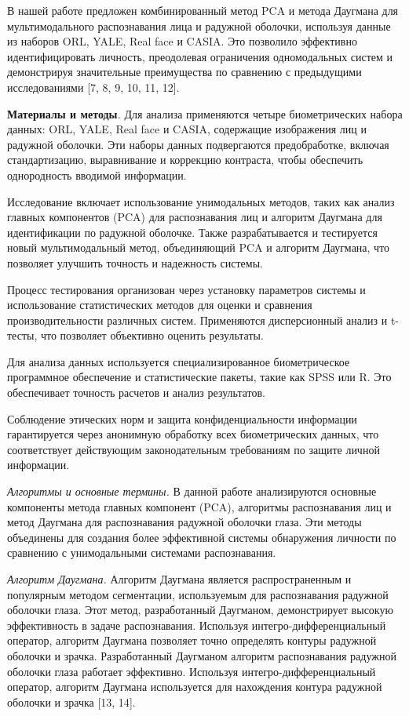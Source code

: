 \begin{multicols}{2}
В нашей работе предложен комбинированный метод PCA и метода Даугмана для
мультимодального распознавания лица и радужной оболочки, используя
данные из наборов ORL, YALE, Real face и CASIA. Это позволило эффективно
идентифицировать личность, преодолевая ограничения одномодальных систем
и демонстрируя значительные преимущества по сравнению с предыдущими
исследованиями {[}7, 8, 9, 10, 11, 12{]}.

{\bfseries Материалы и методы}\emph{.} Для анализа применяются четыре
биометрических набора данных: ORL, YALE, Real face и CASIA, содержащие
изображения лиц и радужной оболочки. Эти наборы данных подвергаются
предобработке, включая стандартизацию, выравнивание и коррекцию
контраста, чтобы обеспечить однородность вводимой информации.

Исследование включает использование унимодальных методов, таких как
анализ главных компонентов (PCA) для распознавания лиц и алгоритм
Даугмана для идентификации по радужной оболочке. Также разрабатывается и
тестируется новый мультимодальный метод, объединяющий PCA и алгоритм
Даугмана, что позволяет улучшить точность и надежность системы.

Процесс тестирования организован через установку параметров системы и
использование статистических методов для оценки и сравнения
производительности различных систем. Применяются дисперсионный анализ и
t-тесты, что позволяет объективно оценить результаты.

Для анализа данных используется специализированное биометрическое
программное обеспечение и статистические пакеты, такие как SPSS или R.
Это обеспечивает точность расчетов и анализ результатов.

Соблюдение этических норм и защита конфиденциальности информации
гарантируется через анонимную обработку всех биометрических данных, что
соответствует действующим законодательным требованиям по защите личной
информации.

\emph{Алгоритмы и основные термины.} В данной работе анализируются
основные компоненты метода главных компонент (PCA), алгоритмы
распознавания лиц и метод Даугмана для распознавания радужной оболочки
глаза. Эти методы объединены для создания более эффективной системы
обнаружения личности по сравнению с унимодальными системами
распознавания.

\emph{Алгоритм Даугмана.} Алгоритм Даугмана является распространенным и
популярным методом сегментации, используемым для распознавания радужной
оболочки глаза. Этот метод, разработанный Даугманом, демонстрирует
высокую эффективность в задаче распознавания. Используя
интегро-дифференциальный оператор, алгоритм Даугмана позволяет точно
определять контуры радужной оболочки и зрачка. Разработанный Даугманом
алгоритм распознавания радужной оболочки глаза работает эффективно.
Используя интегро-дифференциальный оператор, алгоритм Даугмана
используется для нахождения контура радужной оболочки и зрачка {[}13,
14{]}.
\end{multicols}

